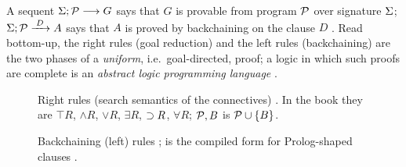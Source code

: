A sequent $\Sigma;\mathcal{P}\longrightarrow G$ says that $G$ is provable from program $\mathcal{P}$ over signature $\Sigma$; $\Sigma;\mathcal{P}\xrightarrow{\;D\;}A$ says that $A$ is proved by backchaining on the clause $D$ .
Read bottom-up, the right rules (goal reduction) and the left rules (backchaining) are the two phases of a \emph{uniform}, i.e.\ goal-directed, proof; a logic in which such proofs are complete is an \emph{abstract logic programming language} .

\begin{figure}[htbp]
\small
{}
\caption{Right rules (search semantics of the connectives) . In the book they are $\top R$, $\wedge R$, $\vee R$, $\exists R$, $\supset R$, $\forall R$; $\mathcal{P},B$ is $\mathcal{P}\cup\{B\}$.}\label{fig:rules-right}
\end{figure}

\begin{figure}[htbp]
\small
{}
\caption{Backchaining (left) rules ;  is the compiled form for Prolog-shaped clauses .}\label{fig:rules-left}
\end{figure}

